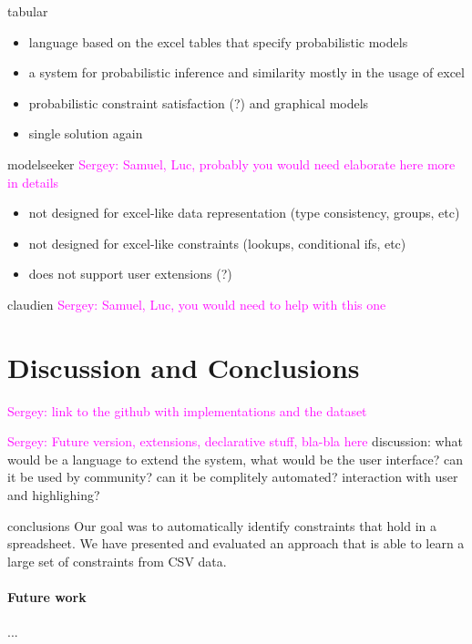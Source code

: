 \documentclass{ecai}
\newcommand{\sergey}[1]{\textcolor{magenta}{{\sc Sergey:} #1}\xspace}
\begin{document}
tabular \cite{tabular}
\begin{itemize}
  \item language based on the excel tables that specify probabilistic models
  \item a system for probabilistic inference and similarity mostly in the usage of excel
  \item probabilistic constraint satisfaction (?) and graphical models
  \item single solution again
\end{itemize}

modelseeker \cite{modelseeker} \sergey{Samuel, Luc, probably you would need elaborate here more in details}

\begin{itemize}
  \item not designed for excel-like data representation (type consistency, groups, etc)
  \item not designed for excel-like constraints (lookups, conditional ifs, etc)
  \item does not support user extensions (?)
\end{itemize}

claudien \cite{claudien} \sergey{Samuel, Luc, you would need to help with this one}

\section{Discussion and Conclusions}
\sergey{link to the github with implementations and the dataset}


\sergey{Future version, extensions, declarative stuff, bla-bla here}
discussion: what would be a language to extend the system, what would be the user interface? can it be used by community?  can it be complitely automated? interaction with user and highlighing?


conclusions 
Our goal was to automatically identify constraints that hold in a spreadsheet.
We have presented and evaluated an approach that is able to learn a large set of constraints from CSV data.

\paragraph{Future work}
...




\end{document}
